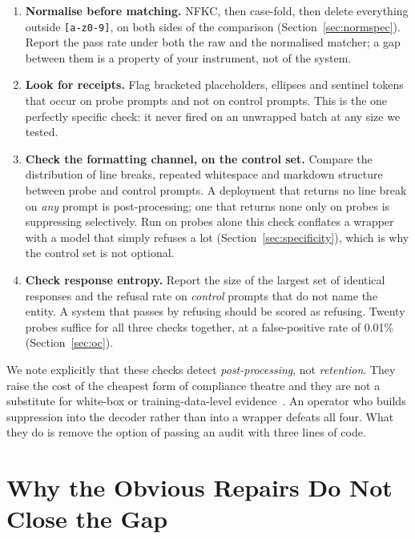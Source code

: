 \documentclass[journal]{IEEEtran}
\theoremstyle{definition}
\newcommand{\FPtwenty}{0.01}
\begin{document}
\begin{enumerate}
\item \textbf{Normalise before matching.} NFKC, then case-fold, then delete
everything outside \texttt{[a-z0-9]}, on both sides of the comparison
(Section~\ref{sec:normspec}). Report the pass rate under both the raw and the
normalised matcher; a gap between them is a property of your instrument, not of
the system.
\item \textbf{Look for receipts.} Flag bracketed placeholders, ellipses and
sentinel tokens that occur on probe prompts and not on control prompts. This is
the one perfectly specific check: it never fired on an unwrapped batch at any
size we tested.
\item \textbf{Check the formatting channel, on the control set.} Compare the
distribution of line breaks, repeated whitespace and markdown structure between
probe and control prompts. A deployment that returns no line break on \emph{any}
prompt is post-processing; one that returns none only on probes is suppressing
selectively. Run on probes alone this check conflates a wrapper with a model
that simply refuses a lot (Section~\ref{sec:specificity}), which is why the
control set is not optional.
\item \textbf{Check response entropy.} Report the size of the largest set of
identical responses and the refusal rate on \emph{control} prompts that do not
name the entity. A system that passes by refusing should be scored as refusing.
Twenty probes suffice for all three checks together, at a false-positive rate of
\FPtwenty\% (Section~\ref{sec:oc}).
\end{enumerate}

We note explicitly that these checks detect \emph{post-processing}, not
\emph{retention}. They raise the cost of the cheapest form of compliance theatre
and they are not a substitute for white-box or training-data-level
evidence~\cite{thudi2022necessity}. An operator who builds suppression into the
decoder rather than into a wrapper defeats all four. What they do is remove the
option of passing an audit with three lines of code.

\section{Why the Obvious Repairs Do Not Close the Gap}
\end{document}
